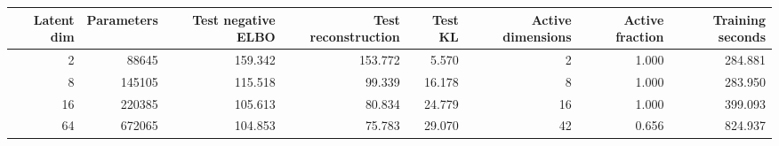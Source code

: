 \begin{tabular}{rrrrrrrr}
\toprule
Latent dim & Parameters & Test negative ELBO & Test reconstruction & Test KL & Active dimensions & Active fraction & Training seconds \\
\midrule
2 & 88645 & 159.342 & 153.772 & 5.570 & 2 & 1.000 & 284.881 \\
8 & 145105 & 115.518 & 99.339 & 16.178 & 8 & 1.000 & 283.950 \\
16 & 220385 & 105.613 & 80.834 & 24.779 & 16 & 1.000 & 399.093 \\
64 & 672065 & 104.853 & 75.783 & 29.070 & 42 & 0.656 & 824.937 \\
\bottomrule
\end{tabular}
